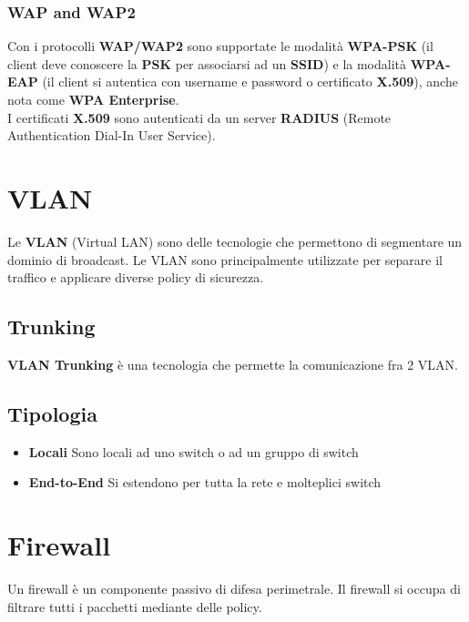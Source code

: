 \documentclass[a4paper]{article}
\begin{document}
\subsubsection{WAP and WAP2}

Con i protocolli \textbf{WAP/WAP2} sono supportate le modalità \textbf{WPA-PSK}
(il client deve conoscere la \textbf{PSK} per associarsi ad un \textbf{SSID}) e la modalità
\textbf{WPA-EAP} (il client si autentica con username e password o certificato \textbf{X.509}),
anche nota come \textbf{WPA Enterprise}.
\\
I certificati \textbf{X.509} sono autenticati da un server \textbf{RADIUS}
(Remote Authentication Dial-In User Service).

\pagebreak

\section{VLAN}

Le \textbf{VLAN} (Virtual LAN) sono delle tecnologie che permettono di segmentare
un dominio di broadcast. Le VLAN sono principalmente utilizzate per separare
il traffico e applicare diverse policy di sicurezza.

\subsection{Trunking}

\textbf{VLAN Trunking} è una tecnologia che permette la comunicazione fra 2 VLAN.

\subsection{Tipologia}

\begin{itemize}
    \item \textbf{Locali} Sono locali ad uno switch o ad un gruppo di switch 
    \item \textbf{End-to-End} Si estendono per tutta la rete e molteplici switch
\end{itemize}

\section{Firewall}

Un firewall è un componente passivo di difesa perimetrale.
Il firewall si occupa di filtrare tutti i pacchetti mediante delle policy.
\end{document}
